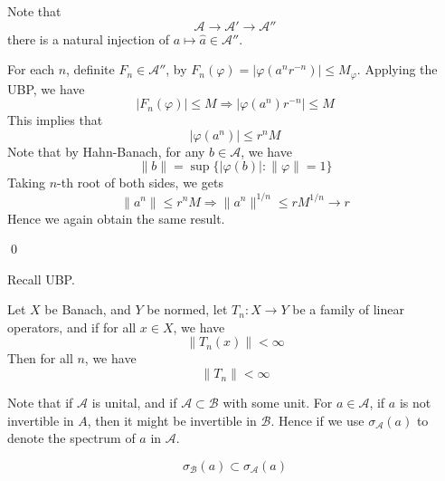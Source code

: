 Note that 
\begin{equation*}
    \mathcal{A}\to \mathcal{A}'\to \mathcal{A}''
\end{equation*}
there is a natural injection of $a\mapsto\widehat{a}\in\mathcal{A}''$.

For each $n$, definite $F_n\in\mathcal{A}''$, by $F_n(\varphi)=|\varphi(a^nr^{-n})|\leq M_\varphi$. Applying the UBP, we have
\begin{equation*}
    |F_n(\varphi)|\leq M\Rightarrow |\varphi(a^n)r^{-n}|\leq M
\end{equation*}
This implies that 
\begin{equation*}
    |\varphi(a^n)|\leq r^nM
\end{equation*}
Note that by Hahn-Banach, for any $b\in\mathcal{A}$, we have
\begin{equation*}
    \|b\|=\sup\{|\varphi(b)|:\|\varphi\|=1\}
\end{equation*}
Taking $n$-th root of both sides, we gets
\begin{equation*}
    \|a^n\|\leq r^nM\Rightarrow \|a^n\|^{1/n}\leq rM^{1/n}\to r
\end{equation*}
Hence we again obtain the same result.

\qed



Recall UBP.
\begin{theorem}
    Let $X$ be Banach, and $Y$ be normed, let $T_n:X\to Y$ be a family of linear operators, and if for all $x\in X$, we have
    \begin{equation*}
        \|T_n(x)\|<\infty
    \end{equation*}
    Then for all $n$, we have
    \begin{equation*}
        \|T_n\|<\infty
    \end{equation*}
\end{theorem}

Note that 
if $\mathcal{A}$ is unital, and if $\mathcal{A}\subset\mathcal{B}$ with some unit. For $a\in\mathcal{A}$, if $a$ is not invertible in $A$, then it might be invertible in $\mathcal{B}$. Hence if we use $\sigma_\mathcal{A}(a)$ to denote the spectrum of $a$ in $\mathcal{A}$.
\begin{proposition}
    \begin{equation*}
        \sigma_\mathcal{B}(a)\subset \sigma_\mathcal{A}(a)
    \end{equation*}
\end{proposition}


